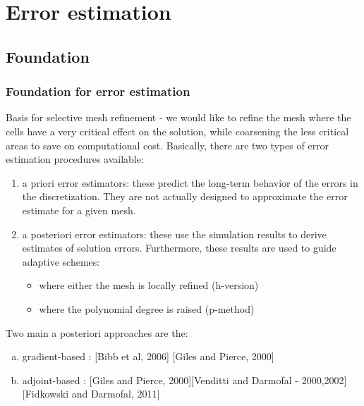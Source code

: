 \documentclass{beamer}
\begin{document}
\section[Error estimates]{Error estimation}

\subsection{Foundation}
\begin{frame}
\frametitle{Foundation for error estimation}
\scriptsize
Basis for selective mesh refinement - we would like to refine the mesh where the cells have a very critical effect on the solution, while coarsening the less critical areas to save on computational cost.\newline 
Basically, there are two types of error estimation procedures available:
\begin{enumerate}[1.]
\item a priori error estimators:  these predict the long-term behavior of the errors in the discretization. They are not actually designed to approximate the error estimate for a given mesh. 
\item a posteriori error estimators: these use the simulation results to derive estimates of solution errors. Furthermore, these results are used to guide adaptive schemes:
\begin{itemize}
\scriptsize
\item where either the mesh is locally refined (h-version) 
\item where the polynomial degree is raised (p-method)
\end{itemize}
\end{enumerate}
Two main a posteriori approaches are the:
\begin{enumerate}[(a)]
\item gradient-based : [Bibb et al, 2006] [Giles and Pierce, 2000]
\item adjoint-based : [Giles and Pierce, 2000][Venditti and Darmofal - 2000,2002][Fidkowski and Darmofal, 2011] 
\end{enumerate}
\end{frame}
\end{document}
